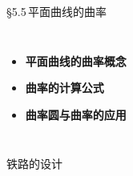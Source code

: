 \begin{frame}
	\titlepage
\end{frame}

\begin{frame}{\S5.5\,平面曲线的曲率}
	\linespread{1.5}
	\begin{columns}
			\vspace{-2cm}
			\begin{itemize}
		      \item {\bf 平面曲线的曲率概念}
		      \item {\bf 曲率的计算公式}
		      \item {\bf 曲率圆与曲率的应用}
		    \end{itemize}
			\vspace{2cm}
	\end{columns}
\end{frame}

\begin{frame}{铁路的设计}
	\linespread{1.2}
	\begin{center}
	\end{center}
\end{frame}

